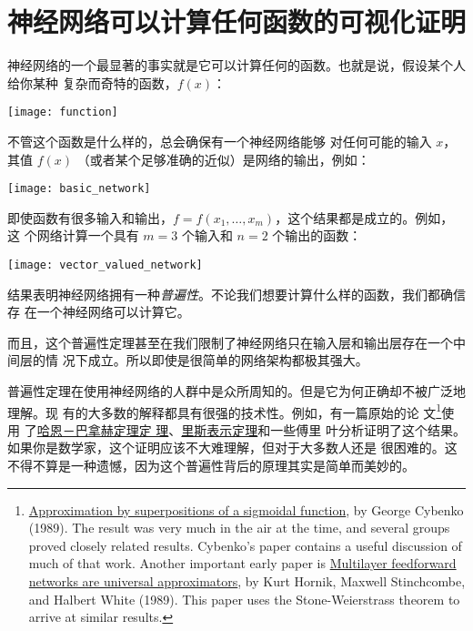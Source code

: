 
\chapter{神经网络可以计算任何函数的可视化证明}
\label{ch:VisualProof}

神经网络的一个最显著的事实就是它可以计算任何的函数。也就是说，假设某个人给你某种
复杂而奇特的函数，$f(x)$：
\begin{center}
  \texttt{[image: function]}
\end{center}

\label{basic_network_precursor}不管这个函数是什么样的，总会确保有一个神经网络能够
对任何可能的输入 $x$，其值 $f(x)$ （或者某个足够准确的近似）是网络的输出，例如：
\begin{center}
  \texttt{[image: basic\_network]}
\end{center}

即使函数有很多输入和输出，$f = f(x_1, \ldots, x_m)$，这个结果都是成立的。例如，这
个网络计算一个具有 $m = 3$ 个输入和 $n = 2$ 个输出的函数：
\begin{center}
  \texttt{[image: vector\_valued\_network]}
\end{center}

结果表明神经网络拥有一种\emph{普遍性}。不论我们想要计算什么样的函数，我们都确信存
在一个神经网络可以计算它。

而且，这个普遍性定理甚至在我们限制了神经网络只在输入层和输出层存在一个中间层的情
况下成立。所以即使是很简单的网络架构都极其强大。

普遍性定理在使用神经网络的人群中是众所周知的。但是它为何正确却不被广泛地理解。现
有的大多数的解释都具有很强的技术性。例如，有一篇原始的论
文\footnote{\href{http://www.dartmouth.edu/~gvc/Cybenko_MCSS.pdf}{Approximation
    by superpositions of a sigmoidal function}, by George Cybenko (1989). The
  result was very much in the air at the time, and several groups proved closely
  related results. Cybenko's paper contains a useful discussion of much of that
  work. Another important early paper is
  \href{http://www.sciencedirect.com/science/article/pii/0893608089900208}{Multilayer
    feedforward networks are universal approximators}, by Kurt Hornik, Maxwell
  Stinchcombe, and Halbert White (1989). This paper uses the Stone-Weierstrass
  theorem to arrive at similar results.}使用
了\href{https://zh.wikipedia.org/wiki/哈恩－巴拿赫定理}{哈恩－巴拿赫定理定
  理}、\href{https://zh.wikipedia.org/wiki/里斯表示定理}{里斯表示定理}和一些傅里
叶分析证明了这个结果。如果你是数学家，这个证明应该不大难理解，但对于大多数人还是
很困难的。这不得不算是一种遗憾，因为这个普遍性背后的原理其实是简单而美妙的。

